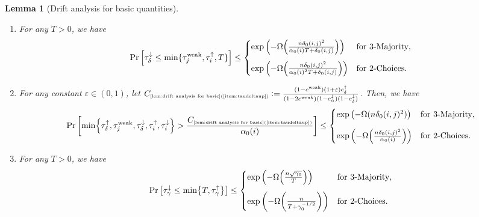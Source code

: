 \documentclass[letterpaper,11pt]{article}
\newtheorem{lemma}[theorem]{Lemma}
\def\defeq{\mathrel{\mathop:}=}
\DeclarePairedDelimiter{\cbra}{\lbrace}{\rbrace} %
\newcommand{\constrefs}[2]{C_{\mbox{\tiny\ref{#1}(\ref{#2})}}}
\newcommand{\alphanorm}{\gamma}
\newcommand{\cweak}{c^{\mathrm{weak}}}
\newcommand{\calphadown}{c^{\downarrow}_\alpha}
\newcommand{\taunormup}{\tau^{\uparrow}_\alphanorm}
\newcommand{\taunormdown}{\tau^{\downarrow}_\alphanorm}
\newcommand{\taudeltaup}{\tau^{\uparrow}_\delta}
\newcommand{\cdeltaup}{c^{\uparrow}_\delta}
\newcommand{\taudeltadown}{\tau^{\downarrow}_\delta}
\newcommand{\cdeltadown}{c^{\downarrow}_\delta}
\newcommand{\tauiup}{\tau^{\uparrow}_i}
\newcommand{\tauidown}{\tau^{\downarrow}_i}
\newcommand{\taujweak}{\tau^{\mathrm{weak}}_j}
\begin{document}
\begin{lemma}[Drift analysis for basic quantities]
\begin{enumerate}
\begin{align*}
    \leq 
    \begin{cases}
      \exp\qty(-\Omega\qty(\frac{n\alphanorm_0}{T})) & \text{for 3-Majority}, \\[10pt]
      \exp\qty(-\Omega\qty(\frac{n\alphanorm_0}{T\alphanorm_0+1})) & \text{for 2-Choices}.
    \end{cases}
\end{align*}
\item \label{item:taudeltadown}
        For any $T> 0$, we have
    \begin{align*}
         \Pr\qty[ \taudeltadown \le \min\{\taujweak,\tauiup,T\} ] \le
         \begin{cases}
           \exp\qty( -\Omega\qty( \frac{n\delta_0(i,j)^2}{\alpha_0(i)T+\delta_0(i,j)} ) ) & \text{for 3-Majority}, \\[10pt]
           \exp\qty( -\Omega\qty(\frac{n \delta_0(i,j)^2}{\alpha_0(i)^2 T+\delta_0(i,j)}) )	&  \text{for 2-Choices}.
         \end{cases}
    \end{align*}
    \item \label{item:taudeltaup}
    For any constant $\varepsilon\in (0,1)$,
    let $\constrefs{lem:drift analysis for basic}{item:taudeltaup}\defeq \frac{(1-\cweak)(1+\varepsilon)\cdeltaup}{(1-2\cweak)(1-\calphadown)(1-\cdeltadown)}$.
    Then, we have
    \begin{align*} 
         \Pr\qty[ \min\cbra*{ \taudeltaup, \taujweak, \taudeltadown,  \tauiup, \tauidown } > \frac{\constrefs{lem:drift analysis for basic}{item:taudeltaup}}{\alpha_0(i)}]
         \leq 
         \begin{cases}
          \exp\qty(-\Omega(n\delta_0(i,j)^2)) & \text{for 3-Majority}, \\[10pt]
          \exp\qty(-\Omega\qty(\frac{n\delta_0(i,j)^2}{\alpha_0(i)}))	& \text{for 2-Choices}.
         \end{cases}
    \end{align*}
    \item \label{item:taunormdown}
    For any $T>0$, we have
    \begin{align*}
        \Pr\qty[\taunormdown\leq \min\cbra*{T,\taunormup}]\le
          \begin{cases}
          \exp\qty(-\Omega\qty(\frac{n\sqrt{\alphanorm_0}}{T})) & \text{for 3-Majority}, \\[10pt]
          \exp\qty(-\Omega\qty(\frac{n}{T+\alphanorm_0^{-1/2}})) & \text{for 2-Choices}.
        \end{cases}
    \end{align*}
\end{enumerate}
\end{lemma}
\end{document}
